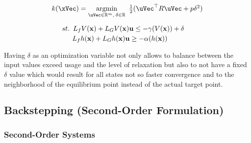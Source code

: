 \begin{equation}
    \begin{array}{l}
        k(\xVec) = \underset{\uVec \in \mathbb{R}^m, \hspace{0.2em} \delta \in \mathbb{R}}{\mathrm{argmin}} \quad \hspace{-0.5em} \frac{1}{2} (\uVec^\top R \uVec + p\delta^2 ) \vspace{1em} \\ 
        \quad \hspace{0.5em}  st. \hspace{0.5em} L_fV(\mathbf{x}) + L_GV(\mathbf{x})\mathbf{u} \leq -\gamma(V(\mathbf{x})) + \delta \vspace{0.25em}\\
        \quad \quad \hspace{1em} L_fh(\mathbf{x}) + L_Gh(\mathbf{x})\mathbf{u} \geq -\alpha(h(\mathbf{x}))
    \end{array}
 \label{eq:CLF-CBF-QP-relaxed}
\end{equation}

Having \(\delta\) as an optimization variable not only allows to balance between the input values exceed usage and the level of relaxation but also to not have a fixed \(\delta\) value which would result for all states not so faster convergence and to the neighborhood of the equilibrium point instead of the actual target point. \\


\newpage %


\subsection{Backstepping (Second-Order Formulation)}
\label{sub:backstepping}

\subsubsection{Second-Order Systems}
\label{subsub:higher_order_systems}

